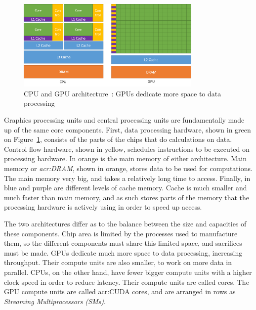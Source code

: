 \begin{figure}[H]
	\centering
	\includegraphics[width=0.8\textwidth]{Chapter_graphics_processing_units/media/gpu-devotes-more-transistors-to-data-processing}
	\caption{CPU and GPU architecture~\cite{Nvidia2021}: GPUs dedicate more space to data processing}
	\label{fig:cpu_gpu}
\end{figure}

Graphics processing units and central processing units are fundamentally made up of the same core
components. First, data processing hardware, shown in green on Figure~\ref{fig:cpu_gpu}, consists of
the parts of the chips that do calculations on data. Control flow hardware, shown in yellow,
schedules instructions to be executed on processing hardware. In orange is the main memory of either
architecture. Main memory or \textit{\acrfull{acr:DRAM}}, shown in orange, stores data to be used
for computations. The main memory very big, and takes a relatively long time to access. Finally, in
blue and purple are different levels of cache memory. Cache is much smaller and much faster than
main memory, and as such stores parts of the memory that the processing hardware is actively using
in order to speed up access.

The two architectures differ as to the balance between the size and capacities of these components.
Chip area is limited by the processes used to manufacture them, so the different components must
share this limited space, and sacrifices must be made. GPUs dedicate much more space to data
processing, increasing throughput. Their compute units are also smaller, to work on more data in
parallel. CPUs, on the other hand, have fewer bigger compute units with a higher clock speed in
order to reduce latency. Their compute units are called cores. The GPU compute units are called
\acrshort{acr:CUDA} cores, and are arranged in rows as \textit{Streaming Multiprocessors (SMs)}.

